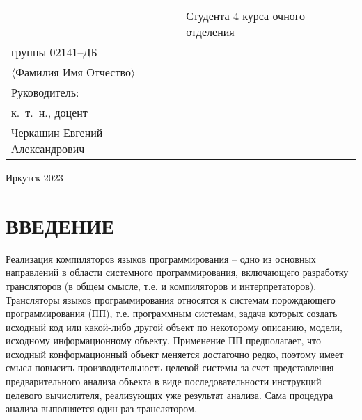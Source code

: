 \documentclass[732,14pt]{studrep}
\begin{document}
\vfill
\noindent\begin{tabularx}{\textwidth} {
  >{\raggedright\arraybackslash}X
  >{\raggedright}X }
&
Студента 4 курса очного отделения\\
группы 02141--ДБ\\
$\langle{}$Фамилия Имя Отчество$\rangle$\\[1em]

Руководитель:\\ %
к.~т.~н., доцент\\[0.5em]
\underline{\hspace{3cm}} Черкашин Евгений Александрович


\end{tabularx}
\vfill
\begin{center}
  Иркутск 2023
\end{center}
\clearpage

\tableofcontents

\chapter*{ВВЕДЕНИЕ}
\label{chap:intro}

Реализация компиляторов языков программирования -- одно из основных направлений в области системного программирования, включающего разработку трансляторов (в общем смысле, т.е. и компиляторов и интерпретаторов).  Трансляторы языков программирования относятся к системам порождающего программирования (ПП), т.е. программным системам, задача которых создать исходный код или какой-либо другой объект по некоторому описанию, модели, исходному информационному объекту.  Применение ПП предполагает, что исходный конформационный объект меняется достаточно редко, поэтому имеет смысл повысить производительность целевой системы за счет представления предварительного анализа объекта в виде последовательности инструкций целевого вычислителя, реализующих уже результат анализа.  Сама процедура анализа выполняется один раз транслятором.
\end{document}
